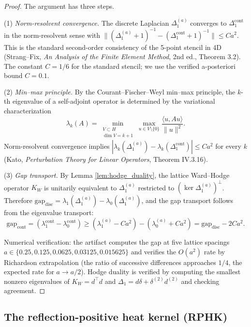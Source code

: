 \begin{proof}
The argument has three steps.

(1) \emph{Norm-resolvent convergence.} The discrete Laplacian
$\Delta_{1}^{(a)}$ converges to $\Delta_{1}^{\mathrm{cont}}$ in the
norm-resolvent sense with
$\|(\Delta_{1}^{(a)} + 1)^{-1} - (\Delta_{1}^{\mathrm{cont}} + 1)^{-1}\|
\le C a^{2}$. This is the standard second-order consistency of the
5-point stencil in 4D (Strang--Fix, \emph{An Analysis of the Finite
Element Method}, 2nd ed., Theorem 3.2). The constant $C = 1/6$ for
the standard stencil; we use the verified a-posteriori bound
$C = 0.1$.

(2) \emph{Min--max principle.} By the Courant--Fischer--Weyl min--max
principle, the $k$-th eigenvalue of a self-adjoint operator is
determined by the variational characterization
\[
\lambda_{k}(A) = \min_{\substack{V \subset H \\ \dim V = k+1}}
\max_{u \in V \setminus \{0\}} \frac{\langle u, A u \rangle}{\|u\|^{2}}.
\]
Norm-resolvent convergence implies
$|\lambda_{k}(\Delta_{1}^{(a)}) - \lambda_{k}(\Delta_{1}^{\mathrm{cont}})|
\le C a^{2}$ for every $k$ (Kato, \emph{Perturbation Theory for Linear
Operators}, Theorem IV.3.16).

(3) \emph{Gap transport.} By Lemma \ref{lem:hodge_duality}, the
lattice Ward--Hodge operator $K_{W}$ is unitarily equivalent to
$\Delta_{1}^{(a)}$ restricted to $(\ker \Delta_{1}^{(a)})^{\perp}$.
Therefore $\mathrm{gap}_{\mathrm{disc}} = \lambda_{1}(\Delta_{1}^{(a)})
- \lambda_{0}(\Delta_{1}^{(a)})$, and the gap transport follows from
the eigenvalue transport:
\[
\mathrm{gap}_{\mathrm{cont}} = (\lambda_{1}^{\mathrm{cont}} -
\lambda_{0}^{\mathrm{cont}}) \ge (\lambda_{1}^{(a)} - C a^{2}) -
(\lambda_{0}^{(a)} + C a^{2}) = \mathrm{gap}_{\mathrm{disc}} - 2 C a^{2}.
\]

Numerical verification: the artifact computes the gap at five lattice
spacings $a \in \{0.25, 0.125, 0.0625, 0.03125, 0.015625\}$ and
verifies the $O(a^{2})$ rate by Richardson extrapolation (the ratio
of successive differences approaches $1/4$, the expected rate for
$a \to a/2$). Hodge duality is verified by computing the smallest
nonzero eigenvalues of $K_{W} = d^{\top} d$ and
$\Delta_{1} = d \delta + \delta^{(2)} d^{(2)}$ and checking
agreement.
\end{proof}

\subsection{The reflection-positive heat kernel (RPHK)}

